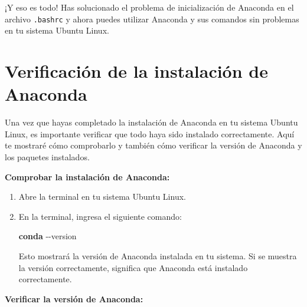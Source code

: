 \documentclass[
  a4paper,
]{article}
\newenvironment{Shaded}{}{}
\newcommand{\AttributeTok}[1]{\textcolor[rgb]{0.84,0.23,0.29}{#1}}
\newcommand{\ExtensionTok}[1]{\textcolor[rgb]{0.84,0.23,0.29}{\textbf{#1}}}
\begin{document}
¡Y eso es todo! Has solucionado el problema de inicialización de
Anaconda en el archivo \texttt{.bashrc} y ahora puedes utilizar Anaconda
y sus comandos sin problemas en tu sistema Ubuntu Linux.

\hypertarget{verificaciuxf3n-de-la-instalaciuxf3n-de-anaconda}{%
\section{Verificación de la instalación de
Anaconda}\label{verificaciuxf3n-de-la-instalaciuxf3n-de-anaconda}}

Una vez que hayas completado la instalación de Anaconda en tu sistema
Ubuntu Linux, es importante verificar que todo haya sido instalado
correctamente. Aquí te mostraré cómo comprobarlo y también cómo
verificar la versión de Anaconda y los paquetes instalados.

\textbf{Comprobar la instalación de Anaconda:}

\begin{enumerate}
\def\labelenumi{\arabic{enumi}.}
\item
  Abre la terminal en tu sistema Ubuntu Linux.
\item
  En la terminal, ingresa el siguiente comando:

\begin{Shaded}
\begin{Highlighting}[]
\ExtensionTok{conda} \AttributeTok{{-}{-}version}
\end{Highlighting}
\end{Shaded}

  Esto mostrará la versión de Anaconda instalada en tu sistema. Si se
  muestra la versión correctamente, significa que Anaconda está
  instalado correctamente.
\end{enumerate}

\textbf{Verificar la versión de Anaconda:}
\end{document}
